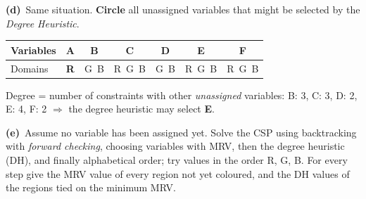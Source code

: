 \documentclass[11pt,a4paper]{article}
\newcommand{\subq}[1]{\par\smallskip\noindent\textbf{#1}\ }
\begin{document}
\subq{(d)}Same situation. \textbf{Circle} all unassigned variables that might be selected by the \emph{Degree Heuristic}.\begin{center}\small\begin{tabular}{|l|c|c|c|c|c|c|}\hline Variables & \textbf{A} & \textbf{B} & \textbf{C} & \textbf{D} & \textbf{E} & \textbf{F}\\ \hline Domains & \textbf{R} & G\ B & R\ G\ B & G\ B & R\ G\ B & R\ G\ B\\ \hline\end{tabular}\end{center}
\begin{solbox}
Degree = number of constraints with other \emph{unassigned} variables: B: 3, C: 3, D: 2, E: 4, F: 2 $\Rightarrow$ the degree heuristic may select \textbf{E}.
\end{solbox}
\subq{(e)}Assume no variable has been assigned yet. Solve the CSP using backtracking with \emph{forward checking}, choosing variables with MRV, then the degree heuristic (DH), and finally alphabetical order; try values in the order R, G, B. For every step give the MRV value of every region not yet coloured, and the DH values of the regions tied on the minimum MRV.
\end{document}
